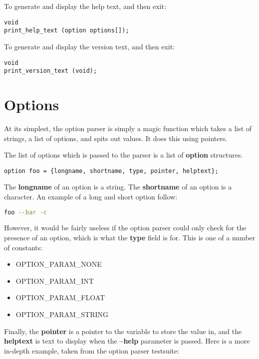 \documentclass[12pt,a4paper]{article}
\begin{document}
To generate and display the help text, and then exit:

\begin{lstlisting}
void
print_help_text (option options[]);
\end{lstlisting}

To generate and display the version text, and then exit:

\begin{lstlisting}
void
print_version_text (void);
\end{lstlisting}

\section{Options}

At its simplest, the option parser is simply a magic function which takes a list of strings, a list of options, and spits out values. It does this using pointers.

The list of options which is passed to the parser is a list of \textbf{option} structures.

\begin{lstlisting}
option foo = {longname, shortname, type, pointer, helptext};
\end{lstlisting}

The \textbf{longname} of an option is a string. The \textbf{shortname} of an option is a character. An example of a long and short option follow:

\begin{lstlisting}[language=bash]
foo --bar -c
\end{lstlisting}

However, it would be fairly useless if the option parser could only check for the presence of an option, which is what the \textbf{type} field is for. This is one of a number of constants:

\begin{itemize}
  \item OPTION\_PARAM\_NONE
  \item OPTION\_PARAM\_INT
  \item OPTION\_PARAM\_FLOAT
  \item OPTION\_PARAM\_STRING
\end{itemize}

Finally, the \textbf{pointer} is a pointer to the variable to store the value in, and the \textbf{helptext} is text to display when the \textbf{--help} parameter is passed. Here is a more in-depth example, taken from the option parser testsuite:
\end{document}
